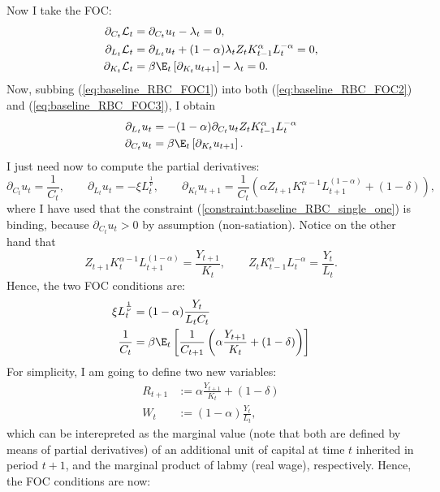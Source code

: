 Now I take the FOC:
\begin{align}
	\partial_{C_t}\mathcal{L}_t &= \partial_{C_t} u_t - \lambda_t  = 0, \label{eq:baseline_RBC_FOC1}\\
	\partial_{L_t}\mathcal{L}_t &= \partial_{L_t} u_t  + (1-\alpha) \lambda_t Z_t K_{t-1}^\alpha L_t^{-\alpha} = 0, \label{eq:baseline_RBC_FOC2}\\
	\partial_{K_t}\mathcal{L}_t &= \beta\E_t\left[\partial_{K_t} u_{t+1}\right] - \lambda_t = 0 \label{eq:baseline_RBC_FOC3}.
\end{align}
Now, subbing (\ref{eq:baseline_RBC_FOC1}) into both (\ref{eq:baseline_RBC_FOC2}) and (\ref{eq:baseline_RBC_FOC3}), I obtain
\begin{align}
	\partial_{L_t} u_t &=  - (1-\alpha) \partial_{C_t} u_t Z_t K_{t-1}^\alpha L_t^{-\alpha} \\
	\partial_{C_t} u_t &= \beta\E_t\left[\partial_{K_t} u_{t+1}\right].
\end{align}
I just need now to compute the partial derivatives:
\begin{equation}
	\partial_{C_t} u_t = \frac{1}{C_t}, \quad\quad \partial_{L_t}u_{t} = -\xi L_t^{\frac{1}{\nu}}, \quad\quad \partial_{K_t} u_{t+1} = \frac{1}{C_t}\left(\alpha Z_{t+1} K_{t}^{\alpha-1} L_{t+1}^{(1-\alpha)} + (1-\delta)\right),
\end{equation}
where I have used that the constraint (\ref{constraint:baseline_RBC_single_one}) is binding, because $\partial_{C_t} u_t > 0$ by assumption (non-satiation). Notice on the other hand that
$$
Z_{t+1} K_{t}^{\alpha-1} L_{t+1}^{(1-\alpha)}  = \frac{Y_{t+1}}{K_{t}}, \quad\quad Z_t K_{t-1}^\alpha L_t^{-\alpha} = \frac{Y_t}{L_t}.
$$
Hence, the two FOC conditions are:
\begin{align}
	\xi L_t^{\frac{1}{\nu}} & =(1-\alpha)\frac{Y_t}{L_t C_t}\\
	\frac{1}{C_t} & = \beta\E_t\left[\frac{1}{C_{t+1}}\left(\alpha \frac{Y_{t+1}}{K_{t}} + (1-\delta)\right)\right]
\end{align}
For simplicity, I am going to define two new variables:
\begin{align}
	R_{t+1} &:= \alpha \frac{Y_{t+1}}{K_t} + (1-\delta)\label{eq:baseline_RBC_Zt}\\
	W_{t} 	&:= (1-\alpha)\frac{Y_t}{L_t}, \label{eq:baseline_RBC_Wt}
\end{align}
which can be interepreted as the marginal value (note that both are defined by means of partial derivatives) of an additional unit of capital at time $t$ inherited in period $t+1$, and the marginal product of labmy (real wage), respectively. Hence, the FOC conditions are now:

